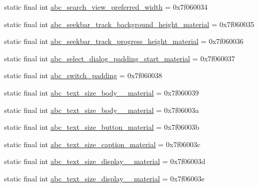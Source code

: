 \begin{DoxyCompactItemize}
static final int \mbox{\hyperlink{classcom_1_1synnapps_1_1carouselview_1_1_r_1_1dimen_ab5df7012b85a948521428c932c6af00a}{abc\+\_\+search\+\_\+view\+\_\+preferred\+\_\+width}} = 0x7f060034
\item 
static final int \mbox{\hyperlink{classcom_1_1synnapps_1_1carouselview_1_1_r_1_1dimen_a98ead5b7bf45fc92eadebad62ebe66e6}{abc\+\_\+seekbar\+\_\+track\+\_\+background\+\_\+height\+\_\+material}} = 0x7f060035
\item 
static final int \mbox{\hyperlink{classcom_1_1synnapps_1_1carouselview_1_1_r_1_1dimen_a4b3d195313179c06ff90699452c63f40}{abc\+\_\+seekbar\+\_\+track\+\_\+progress\+\_\+height\+\_\+material}} = 0x7f060036
\item 
static final int \mbox{\hyperlink{classcom_1_1synnapps_1_1carouselview_1_1_r_1_1dimen_ad261ad5190d05df501e573d4de566c97}{abc\+\_\+select\+\_\+dialog\+\_\+padding\+\_\+start\+\_\+material}} = 0x7f060037
\item 
static final int \mbox{\hyperlink{classcom_1_1synnapps_1_1carouselview_1_1_r_1_1dimen_a9ec2e9cf266dcd9d439de5d0452fb366}{abc\+\_\+switch\+\_\+padding}} = 0x7f060038
\item 
static final int \mbox{\hyperlink{classcom_1_1synnapps_1_1carouselview_1_1_r_1_1dimen_a639968aad0ac9290995c0d2508d3f78d}{abc\+\_\+text\+\_\+size\+\_\+body\+\_\+\_\+material}} = 0x7f060039
\item 
static final int \mbox{\hyperlink{classcom_1_1synnapps_1_1carouselview_1_1_r_1_1dimen_aaf52426859cdf7412243538008f2b90f}{abc\+\_\+text\+\_\+size\+\_\+body\+\_\+\_\+material}} = 0x7f06003a
\item 
static final int \mbox{\hyperlink{classcom_1_1synnapps_1_1carouselview_1_1_r_1_1dimen_a6b9972642733c1b21b0f78e8221a6701}{abc\+\_\+text\+\_\+size\+\_\+button\+\_\+material}} = 0x7f06003b
\item 
static final int \mbox{\hyperlink{classcom_1_1synnapps_1_1carouselview_1_1_r_1_1dimen_a57670ad0eb2d3175703838b8fb592edb}{abc\+\_\+text\+\_\+size\+\_\+caption\+\_\+material}} = 0x7f06003c
\item 
static final int \mbox{\hyperlink{classcom_1_1synnapps_1_1carouselview_1_1_r_1_1dimen_a577eee7bfe7650fecc20bb4b403193ed}{abc\+\_\+text\+\_\+size\+\_\+display\+\_\+\_\+material}} = 0x7f06003d
\item 
static final int \mbox{\hyperlink{classcom_1_1synnapps_1_1carouselview_1_1_r_1_1dimen_acd270e18e05b1b5f3598b0e933cacc03}{abc\+\_\+text\+\_\+size\+\_\+display\+\_\+\_\+material}} = 0x7f06003e
\item 

\end{DoxyCompactItemize}
